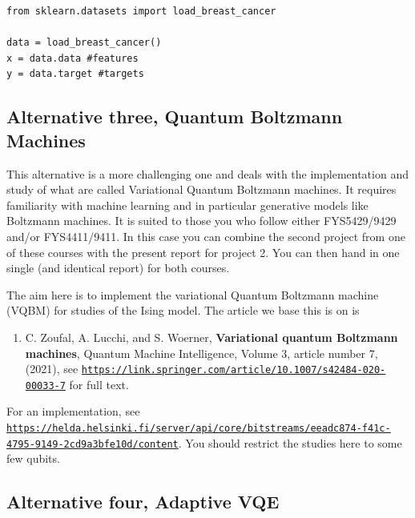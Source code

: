 \documentclass[%
oneside,                 %
final,                   %
10pt]{article}
\begin{document}
\begin{verbatim}
from sklearn.datasets import load_breast_cancer

data = load_breast_cancer()
x = data.data #features
y = data.target #targets

\end{verbatim}


\subsection*{Alternative three, Quantum Boltzmann Machines}

This alternative is a more challenging one and deals with the
implementation and study of what are called Variational Quantum
Boltzmann machines.  It requires familiarity with machine learning and
in particular generative models like Boltzmann machines. It is suited
to those you who follow either FYS5429/9429 and/or FYS4411/9411. In
this case you can combine the second project from one of these courses
with the present report for project 2. You can then hand in one single
(and identical report) for both courses.

The aim here is to implement the variational Quantum Boltzmann machine (VQBM) for studies of the Ising model.
The article we base this is on is
\begin{enumerate}
\item C. Zoufal, A. Lucchi, and S. Woerner, \textbf{Variational quantum Boltzmann machines}, Quantum Machine Intelligence, Volume 3, article number 7, (2021), see \href{{https://link.springer.com/article/10.1007/s42484-020-00033-7}}{\nolinkurl{https://link.springer.com/article/10.1007/s42484-020-00033-7}} for full text.
\end{enumerate}

\noindent
For an implementation, see \href{{https://helda.helsinki.fi/server/api/core/bitstreams/eeadc874-f41c-4795-9149-2cd9a3bfe10d/content}}{\nolinkurl{https://helda.helsinki.fi/server/api/core/bitstreams/eeadc874-f41c-4795-9149-2cd9a3bfe10d/content}}. You should restrict the studies here to some few qubits.  

\subsection*{Alternative four, Adaptive VQE}
\end{document}
